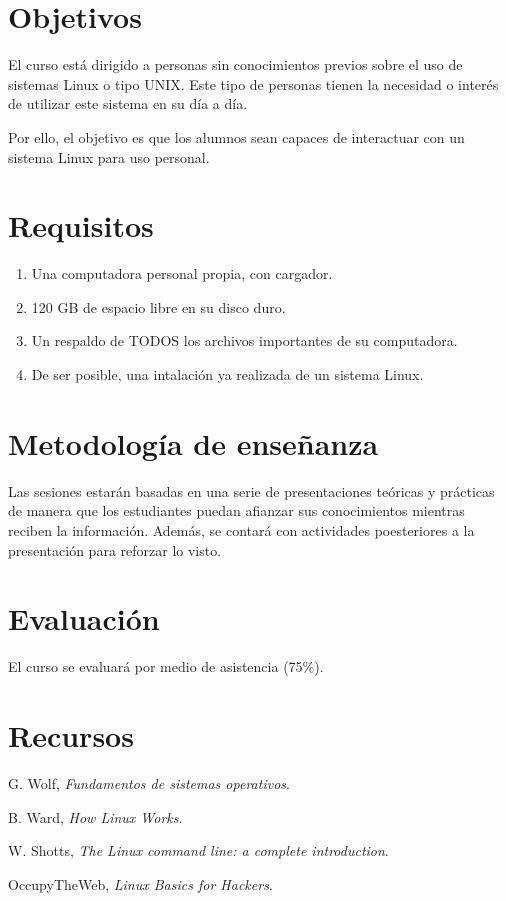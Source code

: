 \documentclass[a4paper,11pt]{article}                 %
\begin{document}
  \section{Objetivos}

    El curso está dirigido a personas sin conocimientos previos sobre el uso de sistemas Linux o tipo UNIX. Este tipo de personas tienen la necesidad o interés de utilizar este sistema en su día a día.

    Por ello, el objetivo es que los alumnos sean capaces de interactuar con un sistema Linux para uso personal.

  \section{Requisitos}

    \begin{enumerate}
        \item Una computadora personal propia, con cargador.
        \item 120 GB de espacio libre en su disco duro.
        \item Un respaldo de TODOS los archivos importantes de su computadora.
        \item De ser posible, una intalación ya realizada de un sistema Linux.
    \end{enumerate}

  \section{Metodología de enseñanza}

    Las sesiones estarán basadas en una serie de presentaciones teóricas y prácticas de manera que los estudiantes puedan afianzar sus conocimientos mientras reciben la información. Además, se contará con actividades poesteriores a la presentación para reforzar lo visto.

  \section{Evaluación}

    El curso se evaluará por medio de asistencia (75\%).

  \section{Recursos}

    \begin{thebibliography}{99}

      G. Wolf,
      \textit{Fundamentos de sistemas operativos}.

      B. Ward,
      \textit{How Linux Works}.

      W. Shotts,
      \textit{The Linux command line: a complete introduction}.

      OccupyTheWeb,
      \textit{Linux Basics for Hackers}.

    \end{thebibliography}
\end{document}
